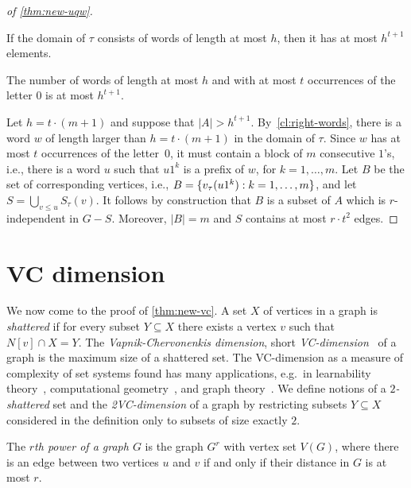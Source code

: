 \begin{proof}[of \cref{thm:new-uqw}]
\begin{claim}\label{cl:right-words}
  If the domain of $\tau$ consists of words of length at most $h$, then it has at most $h^{t+1}$  elements.  
\end{claim}
\begin{clproof}
The number of words of length at most $h$ and with at most $t$ occurrences of the letter $0$ is at most $h^{t+1}$.
\end{clproof}

  
  Let $h=t\cdot (m+1)$ and suppose that
  $|A|>h^{t+1}$. By~\cref{cl:right-words},  there is a word $w$ of length larger than $h=t\cdot (m+1)$ in the domain of $\tau$. Since $w$ has at most $t$ occurrences of the letter~$0$, it  must contain a block of $m$ consecutive $1$'s, i.e., there is a word $u$ such that $u1^k$ is a prefix of $w$, for $k=1,\ldots,m$.
Let $B$ be the set of corresponding vertices, i.e., $B=\{v_\tau(u1^k):k=1,\ldots,m\}$,
and let $S=\bigcup_{v\le u}S_\tau(v)$.
It follows by construction that $B$ is a subset of $A$ which is $r$-independent in $G-S$.  Moreover, $|B|=m$ and 
$S$ contains at most $r\cdot t^2$ edges.
  \end{proof}
  
  
  
  

\section{VC dimension}\label{sec:vc}

We now come to the proof of \cref{thm:new-vc}. A set $X$ of vertices 
in a graph is \emph{shattered} if for every
subset $Y\subseteq X$ there exists 
a vertex $v$ such that $N[v]\cap X=Y$. The \emph{Vapnik-Chervonenkis dimension}, short \emph{VC-dimension}~\cite{chervonenkis1971theory} of a graph is the maximum size of a shattered set. 
The VC-dimension as a measure of complexity of set systems found has many applications, e.g.\ in learnability theory~\cite{haussler1987}, computational geometry~\cite{chazelle1989quasi},
and graph theory~\cite{alon2006dominating,BousquetT15,chepoi2007covering,eickmeyer2016neighborhood}.
We define notions of a {\em{$2$-shattered}} set and the {\em{2VC-dimension}} of a graph by restricting subsets $Y\subseteq X$ considered in the definition only to subsets of size exactly $2$.

The \emph{$r$th power of a graph $G$} is the graph $G^r$
with vertex set $V(G)$, where there is an edge between two 
vertices $u$ and $v$ if and only if their distance in $G$ is at most $r$. 

